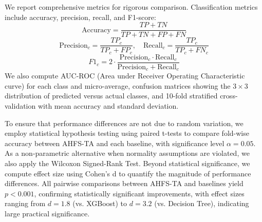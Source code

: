 \documentclass[journal]{IEEEtran}
\begin{document}
\begin{table}[h]
\centering
\caption{Baseline Model Hyperparameters}
\label{tab:hyperparams}
\end{table}

We report comprehensive metrics for rigorous comparison. Classification metrics include accuracy, precision, recall, and F1-score:
\begin{equation}
\text{Accuracy} = \frac{TP + TN}{TP + TN + FP + FN}
\end{equation}
\begin{equation}
\text{Precision}_c = \frac{TP_c}{TP_c + FP_c}, \quad \text{Recall}_c = \frac{TP_c}{TP_c + FN_c}
\end{equation}
\begin{equation}
F1_c = 2 \cdot \frac{\text{Precision}_c \cdot \text{Recall}_c}{\text{Precision}_c + \text{Recall}_c}
\end{equation}
We also compute AUC-ROC (Area under Receiver Operating Characteristic curve) for each class and micro-average, confusion matrices showing the $3 \times 3$ distribution of predicted versus actual classes, and 10-fold stratified cross-validation with mean accuracy and standard deviation.

To ensure that performance differences are not due to random variation, we employ statistical hypothesis testing using paired t-tests to compare fold-wise accuracy between AHFS-TA and each baseline, with significance level $\alpha = 0.05$. As a non-parametric alternative when normality assumptions are violated, we also apply the Wilcoxon Signed-Rank Test. Beyond statistical significance, we compute effect size using Cohen's d to quantify the magnitude of performance differences. All pairwise comparisons between AHFS-TA and baselines yield $p < 0.001$, confirming statistically significant improvements, with effect sizes ranging from $d = 1.8$ (vs. XGBoost) to $d = 3.2$ (vs. Decision Tree), indicating large practical significance.
\end{document}
